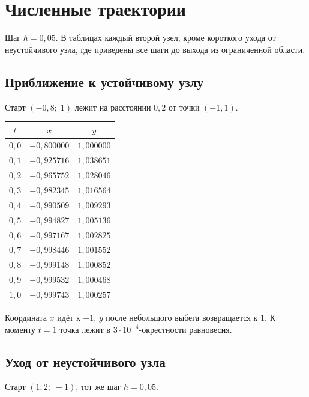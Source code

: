 \documentclass[12pt,a4paper]{article}
\begin{document}
\section{Численные траектории}

Шаг \(h = 0{,}05\). В таблицах каждый второй узел, кроме короткого ухода от неустойчивого узла, где приведены все шаги до выхода из ограниченной области.

\subsection{Приближение к устойчивому узлу}

Старт \((-0{,}8;\; 1)\) лежит на расстоянии \(0{,}2\) от точки \((-1,1)\).

\begin{center}
\begin{tabular}{ccc}
\toprule
\(t\) & \(x\) & \(y\) \\
\midrule
\(0{,}0\) & \(-0{,}800000\) & \(1{,}000000\) \\
\(0{,}1\) & \(-0{,}925716\) & \(1{,}038651\) \\
\(0{,}2\) & \(-0{,}965752\) & \(1{,}028046\) \\
\(0{,}3\) & \(-0{,}982345\) & \(1{,}016564\) \\
\(0{,}4\) & \(-0{,}990509\) & \(1{,}009293\) \\
\(0{,}5\) & \(-0{,}994827\) & \(1{,}005136\) \\
\(0{,}6\) & \(-0{,}997167\) & \(1{,}002825\) \\
\(0{,}7\) & \(-0{,}998446\) & \(1{,}001552\) \\
\(0{,}8\) & \(-0{,}999148\) & \(1{,}000852\) \\
\(0{,}9\) & \(-0{,}999532\) & \(1{,}000468\) \\
\(1{,}0\) & \(-0{,}999743\) & \(1{,}000257\) \\
\bottomrule
\end{tabular}
\end{center}

Координата \(x\) идёт к \(-1\), \(y\) после небольшого выбега возвращается к \(1\). К моменту \(t = 1\) точка лежит в \(3\cdot 10^{-4}\)-окрестности равновесия.

\subsection{Уход от неустойчивого узла}

Старт \((1{,}2;\; -1)\), тот же шаг \(h = 0{,}05\).
\end{document}
